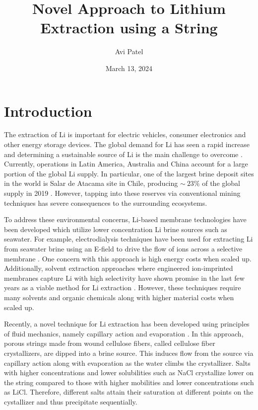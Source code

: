 \documentclass{article}
\title{Novel Approach to Lithium Extraction using a String}
\author{Avi Patel}
\date{March 13, 2024}
\begin{document}
\maketitle

\section*{Introduction}

The extraction of Li is important for electric vehicles, consumer electronics and other energy storage devices. The global demand for Li has seen a rapid increase and determining a sustainable source of Li is the main challenge to overcome \cite{Miatto2021}. Currently, operations in Latin America, Australia and China account for a large portion of the global Li supply. 
In particular, one of the largest brine deposit sites in the world is Salar de Atacama site in Chile, producing $\sim~23\%$ of the global supply in 2019 \cite{Cabello2021}.
However, tapping into these reserves via conventional mining techniques has severe consequences to the surrounding ecosystems. 

To address these environmental concerns, Li-based membrane technologies have been developed which utilize lower concentration Li brine sources such as seawater. For example, electrodialysis techniques have been used for extracting Li from seawater brine using an E-field to drive the flow of ions across a selective membrane \cite{Jiang2014}. One concern with this approach is high energy costs when scaled up. Additionally, solvent extraction approaches where engineered ion-imprinted membranes capture Li with high selectivity have shown promise in the last few years as a viable method for Li extraction \cite{Cui2018}. However, these techniques require many solvents and organic chemicals along with higher material costs when scaled up. 

Recently, a novel technique for Li extraction has been developed using principles of fluid mechanics, namely capillary action and evaporation \cite{Chen2023}. In this approach, porous strings made from wound cellulose fibers, called cellulose fiber crystallizers, are dipped into a brine source. This induces flow from the source via capillary action along with evaporation as the water climbs the crystallizer. Salts with higher concentrations and lower solubilities such as NaCl crystallize lower on the string compared to those with higher mobilities and lower concentrations such as LiCl. Therefore, different salts attain their saturation at different points on the cystallizer and thus precipitate sequentially. 
\end{document}
